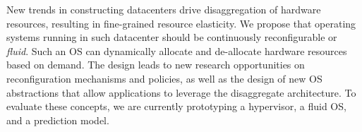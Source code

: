 New trends in constructing datacenters drive disaggregation of
hardware resources, resulting in fine-grained resource elasticity.
We propose that operating systems running in such datacenter should
be continuously reconfigurable or \emph{fluid}. Such an OS can dynamically
allocate and de-allocate hardware resources based on demand.
The design leads to new research opportunities
on reconfiguration mechanisms and policies, as well as the design of
new OS abstractions that allow applications to leverage the disaggregate
architecture.
To evaluate these concepts, we are currently prototyping
a hypervisor, a fluid OS, and a prediction model.

